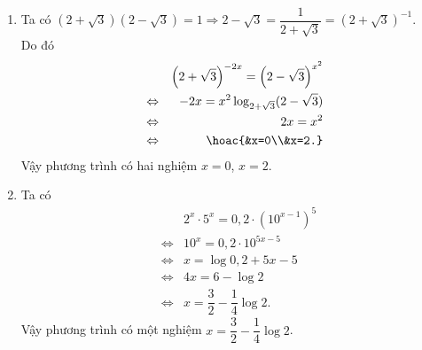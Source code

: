 \begin{ex}
{\begin{enumerate}
\begin{eqnarray*}
				&\Leftrightarrow& x^2+(2-\log_5 2)x+(\log_5 2 -3)=0  \\
				&\Leftrightarrow& \hoac{&x=1\\&x=-3+\log_5  2.}
			\end{eqnarray*}
			 Vậy phương trình có hai nghiệm $x=1$, $x=-3+\log_5 2$.
			 \item
			Ta  có $(2+\sqrt{3})(2-\sqrt{3})=1 \Rightarrow 2-\sqrt{3}=\dfrac{1}{2+\sqrt{3}}=(2+\sqrt{3})^{-1}$.\\
			Do  đó
			\begin{eqnarray*}
				&&\left(2+\sqrt{3}\right)^{-2x}=\left(2-\sqrt{3}\right)^{x^2} \\ &\Leftrightarrow& -2x=x^2\log_{2+\sqrt{3}} (2-\sqrt{3}) \\ 
				&\Leftrightarrow& 2x=x^2 \\ 
				&\Leftrightarrow& \hoac{&x=0\\&x=2.}\\ 
			\end{eqnarray*}
			Vậy phương trình có hai nghiệm $x=0$, $x=2$. 
			 \item Ta có
			\begin{eqnarray*}
				&&2^x\cdot  5^x=0{,}2\cdot \left(10^{x-1}\right)^5 \\
				&\Leftrightarrow& 10^x=0{,}2\cdot  10^{5x-5}\\
				&\Leftrightarrow&  x=\log 0{,}2 +5x-5\\
				&\Leftrightarrow& 4x=6-\log  2\\
				&\Leftrightarrow& x=\dfrac{3}{2}-\dfrac{1}{4}\log  2.
			\end{eqnarray*}
			Vậy phương  trình có một nghiệm $x=\dfrac{3}{2}-\dfrac{1}{4}\log 2$.
		\end{enumerate}
	} 
\end{ex}

